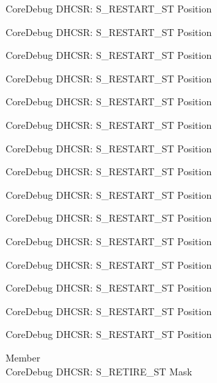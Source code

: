 \begin{DoxyRefList}
\label{deprecated__deprecated000107}%
%
Core\+Debug DHCSR\+: S\+\_\+\+RESTART\+\_\+\+ST Position 

\label{deprecated__deprecated000161}%
%
Core\+Debug DHCSR\+: S\+\_\+\+RESTART\+\_\+\+ST Position 

\label{deprecated__deprecated000246}%
%
Core\+Debug DHCSR\+: S\+\_\+\+RESTART\+\_\+\+ST Position 

\label{deprecated__deprecated000303}%
%
Core\+Debug DHCSR\+: S\+\_\+\+RESTART\+\_\+\+ST Position 

\label{deprecated__deprecated000379}%
%
Core\+Debug DHCSR\+: S\+\_\+\+RESTART\+\_\+\+ST Position 

\label{deprecated__deprecated000458}%
%
Core\+Debug DHCSR\+: S\+\_\+\+RESTART\+\_\+\+ST Position 

\label{deprecated__deprecated000560}%
%
Core\+Debug DHCSR\+: S\+\_\+\+RESTART\+\_\+\+ST Position 

\label{deprecated__deprecated000666}%
%
Core\+Debug DHCSR\+: S\+\_\+\+RESTART\+\_\+\+ST Position 

\label{deprecated__deprecated000766}%
%
Core\+Debug DHCSR\+: S\+\_\+\+RESTART\+\_\+\+ST Position 

\label{deprecated__deprecated000820}%
%
Core\+Debug DHCSR\+: S\+\_\+\+RESTART\+\_\+\+ST Position 

\label{deprecated__deprecated000905}%
%
Core\+Debug DHCSR\+: S\+\_\+\+RESTART\+\_\+\+ST Position 

\label{deprecated__deprecated000962}%
%
Core\+Debug DHCSR\+: S\+\_\+\+RESTART\+\_\+\+ST Position 

\label{deprecated__deprecated001038}%
%
Core\+Debug DHCSR\+: S\+\_\+\+RESTART\+\_\+\+ST Position 

\label{deprecated__deprecated001117}%
%
Core\+Debug DHCSR\+: S\+\_\+\+RESTART\+\_\+\+ST Position 

\label{deprecated__deprecated001219}%
%
Core\+Debug DHCSR\+: S\+\_\+\+RESTART\+\_\+\+ST Position  
\item[Member \doxylink{group___c_m_s_i_s___core_debug_ga89dceb5325f6bcb36a0473d65fbfcfa6}{Core\+Debug\+\_\+\+DHCSR\+\_\+\+S\+\_\+\+RETIRE\+\_\+\+ST\+\_\+\+Msk} ]\hfill \\
\label{deprecated__deprecated000012}%
%
Core\+Debug DHCSR\+: S\+\_\+\+RETIRE\+\_\+\+ST Mask 


\end{DoxyRefList}

